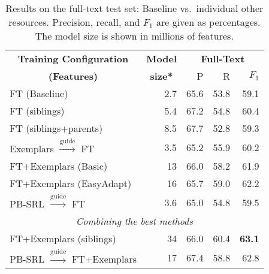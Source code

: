 
\setlength\tabcolsep{4pt}

\begin{table}\centering\small
\def\arraystretch{1}
\begin{tabular}{lr<{\hspace*{5pt}}rrr}%
\toprule
\multicolumn{1}{c}{\textbf{Training Configuration}} 
& \multicolumn{1}{c}{\textbf{Model}} 
& \multicolumn{3}{c}{\textbf{Full-Text}} \\ %
\cline{3-5}%
 \multicolumn{1}{c}{\textbf{(Features)}} 
& \multicolumn{1}{c}{\textbf{size*}} 
& P & R & $F_1$ \\
\midrule
FT (Baseline) & 2.7 & 65.6 & 53.8 & 59.1 \\ %
\midrule
FT (siblings) & 5.4 & 67.2 & 54.8 & 60.4 \\
FT (siblings+parents) & 8.5 & 67.7 & 52.8 & 59.3 \\
\midrule
Exemplars $\xrightarrow{\text{guide}}$ FT & 3.5 & 65.2 & 55.9 & 60.2 \\
FT+Exemplars (Basic) & 13\nss{.?} & 66.0 & 58.2 & 61.9 \\
FT+Exemplars (EasyAdapt) & 16\nss{.?} & 65.7 & 59.0 & 62.2 \\
\midrule
PB-SRL $\xrightarrow{\text{guide}}$ FT & 3.6 & 65.0 & 54.8 & 59.5 \\
\midrule
\multicolumn{5}{c}{\em{Combining the best methods}}\\
\midrule
FT+Exemplars (siblings) & 34 & 66.0 & 60.4 & \textbf{63.1} \\
PB-SRL $\xrightarrow{\text{guide}}$ FT+Exemplars & 17 & 67.4 & 58.8 & 62.8 \\
\bottomrule
\end{tabular}
\caption{Results on the full-text test set:
Baseline vs.~individual other resources.
Precision, recall, and $F_1$ are given as percentages. The model size is shown in millions of features.}
\label{tbl:results}
\end{table}

